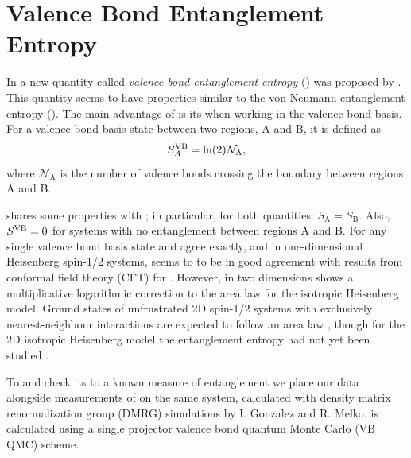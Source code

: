 \chapter{Valence Bond Entanglement Entropy}

In  a new quantity called {\it{valence bond entanglement entropy}} (\vB) was proposed by .  
This quantity seems to have properties similar to the von Neumann entanglement entropy (\vN).
The main advantage of \vb is its  when working in the valence bond basis.
For a valence bond basis state \vb between two regions, A and B, it is defined as 
\begin{equation}
S^{\text{VB}}_A = \ln({2})\mathcal{N}_{\text{A}},
\end{equation} 
where $\mathcal{N}_{\text{A}}$ is the number of valence bonds crossing the boundary between
regions A and B.


\vb shares some properties with \vN; in particular, for both quantities: $S_{\text{A}} = S_{\text{B}}$.
Also, $S^{\text{VB}} = 0$ for systems with no entanglement between regions A and B.
For any single valence bond basis state \vb and \vn agree exactly, and
in one-dimensional Heisenberg spin-1/2 systems, \vb seems to to be in good agreement with
results from conformal field theory (CFT) for \vN.
However, in two dimensions \vb shows a multiplicative logarithmic correction to the area law
for the isotropic Heisenberg model.  
Ground states of unfrustrated 2D spin-1/2 systems with exclusively nearest-neighbour interactions
are expected to follow an area law , though for the 2D isotropic Heisenberg model the entanglement entropy had not yet been studied .


To   and check its  to a known measure of entanglement we place our \vb data alongside measurements of \vn
on the same system, calculated with density matrix renormalization group (DMRG) simulations by I. Gonzalez and R. Melko.
\vb is calculated using a single projector valence bond quantum Monte Carlo (VB QMC) scheme.

